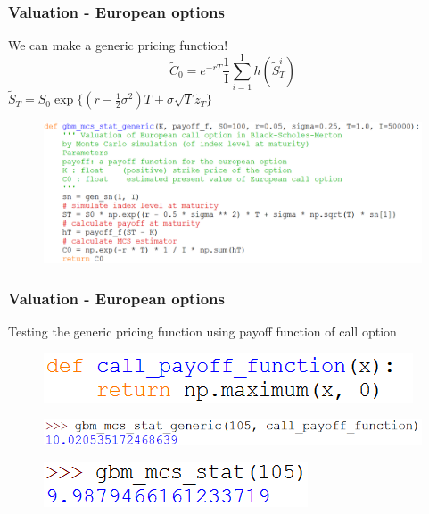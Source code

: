 \documentclass{beamer}
\begin{document}
\begin{frame}
\frametitle{Valuation - European options}
\begin{center}
We can make a generic pricing function!
$$\tilde{C}_{0} = e^{-rT} \frac{1}{\mathrm{I}} \sum_{i=1}^{\mathrm{I}} h({\tilde{S}}_{T}^{i}) $$
$\tilde{S}_{T} = S_{0}\exp\{(r-\frac{1}{2}\sigma^{2})T + \sigma\sqrt{T}\tilde{z}_{T}\}$
\begin{figure}[H]
	\includegraphics[scale=0.4]{european_option_mcs.png}
\end{figure}
\end{center}
\end{frame}

\begin{frame}
\frametitle{Valuation - European options}
\begin{center}
Testing the generic pricing function using payoff function of call option\\[3mm]
\begin{figure}[H]
	\includegraphics[scale=0.8]{call_payoff_function.png}
\end{figure}
\begin{figure}[H]
	\includegraphics[scale=0.6]{test_european_option_mcs.png}
\end{figure}
\begin{figure}[H]
	\includegraphics[scale=0.6]{test_european_call_mcs.png}
\end{figure}
\end{center}
\end{frame}
\end{document}
